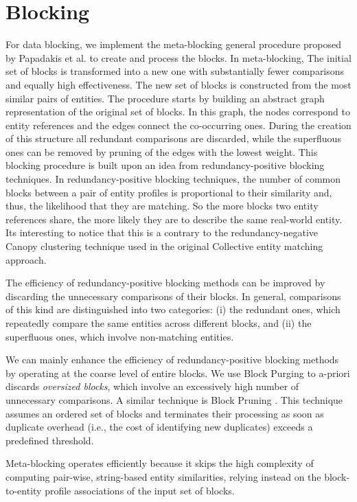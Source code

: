 \section{Blocking}
For data blocking, we implement the meta-blocking general procedure proposed by Papadakis et al. \cite{GGT*13} to create and process the blocks. In meta-blocking, The initial set of blocks is transformed into a new one with substantially fewer comparisons and equally high effectiveness. The new set of blocks is constructed from the most similar pairs of entities. The procedure starts by building an abstract graph representation of the original set of blocks. In this graph, the nodes correspond to entity references and the edges connect the co-occurring ones. During the creation of this structure all redundant comparisons are discarded, while the superfluous ones can be removed by pruning of the edges with the lowest weight.
This blocking procedure is built upon an idea from redundancy-positive blocking techniques. In redundancy-positive blocking techniques, the number of common blocks between a pair of entity profiles is proportional to their similarity and, thus, the likelihood that they are matching. So the more blocks two entity references share, the more likely they are to describe the same real-world entity. Its interesting to notice that this is a contrary to the redundancy-negative Canopy clustering technique used in the original Collective entity matching approach\cite{GGT*13}.

The efficiency of redundancy-positive blocking methods can be improved by discarding the unnecessary comparisons of their blocks. In general, comparisons of this kind are distinguished into two categories: (i) the redundant ones, which repeatedly compare the same entities across different blocks, and (ii) the superfluous ones, which involve non-matching entities\cite{GGT*13}. 

We can mainly enhance the efficiency of redundancy-positive blocking methods by operating at the coarse level of entire blocks. We use Block Purging \cite{PIN*11} to a-priori discards \textit{oversized blocks}, which involve an excessively high number of unnecessary comparisons.
A similar technique is Block Pruning \cite{PIN*11}. This technique assumes an ordered set of blocks and terminates their processing as soon as duplicate overhead (i.e., the cost of identifying new duplicates) exceeds a predefined threshold\cite{GGT*13}.

Meta-blocking operates efficiently because it skips the high complexity of computing pair-wise, string-based entity similarities, relying instead on the block-to-entity profile associations of the input set of blocks\cite{GGT*13}.

